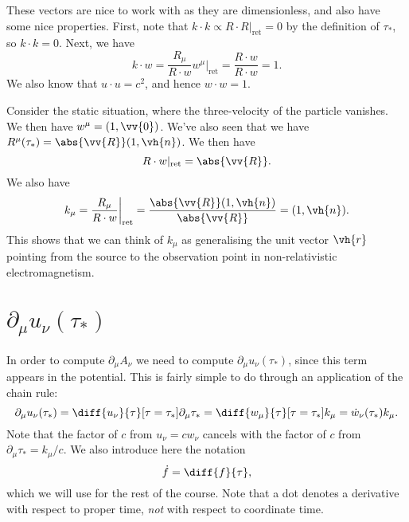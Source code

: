 \documentclass[fleqn]{NotesClass}
\newcommand*{\ret}{{\text{ret}}}
\begin{document}
    These vectors are nice to work with as they are dimensionless, and also have some nice properties.
    First, note that \(k \cdot k \propto R \cdot R|_{\ret} = 0\) by the definition of \(\tau_*\), so \(k\cdot k = 0\).
    Next, we have
    \begin{equation}
        k \cdot w = \frac{R_\mu}{R \cdot w} w^\mu \bigg|_{\ret} = \frac{R\cdot w}{R \cdot w} = 1.
    \end{equation}
    We also know that \(u \cdot u = c^2\), and hence \(w \cdot w = 1\).
    
    Consider the static situation, where the three-velocity of the particle vanishes.
    We then have \(w^\mu = (1, \vv{0})\).
    We've also seen that we have \(R^\mu(\tau_*) = \abs{\vv{R}}(1, \vh{n})\).
    We then have
    \begin{equation}
        R \cdot w|_{\ret} = \abs{\vv{R}}.
    \end{equation}
    We also have
    \begin{equation}
        k_\mu = \frac{R_\mu}{R \cdot w} \bigg|_{\ret} = \frac{\abs{\vv{R}}(1, \vh{n})}{\abs{\vv{R}}} = (1, \vh{n}).
    \end{equation}
    This shows that we can think of \(k_\mu\) as generalising the unit vector \(\vh{r}\) pointing from the source to the observation point in non-relativistic electromagnetism.
    
    \section{\texorpdfstring{\(\partial_\mu u_\nu(\tau_*)\)}{Derivative of Four-Velocity}}\label{sec:derivative of four-vel}
    In order to compute \(\partial_\mu A_\nu\) we need to compute \(\partial_\mu u_\nu(\tau_*)\), since this term appears in the potential.
    This is fairly simple to do through an application of the chain rule:
    \begin{equation}
        \partial_\mu u_\nu(\tau_*) = \diff{u_\nu}{\tau}[\tau = \tau_*] \partial_\mu \tau_* = \diff{w_\mu}{\tau}[\tau = \tau_*] k_\mu = \dot{w}_\nu(\tau_*) k_\mu.
    \end{equation}
    Note that the factor of \(c\) from \(u_\nu = cw_\nu\) cancels with the factor of \(c\) from \(\partial_\mu \tau_* = k_\mu/c\).
    We also introduce here the notation
    \begin{equation}
        \dot{f} = \diff{f}{\tau},
    \end{equation}
    which we will use for the rest of the course.
    Note that a dot denotes a derivative with respect to proper time, \emph{not} with respect to coordinate time.
    
\end{document}
